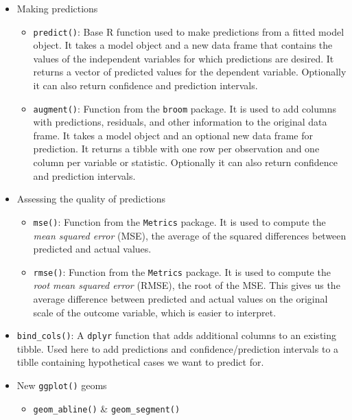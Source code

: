 \documentclass[
]{book}
\providecommand{\tightlist}{%
  \setlength{\itemsep}{0pt}\setlength{\parskip}{0pt}}
\begin{document}
\begin{itemize}
\tightlist
\item
  Making predictions

  \begin{itemize}
  \tightlist
  \item
    \texttt{predict()}: Base R function used to make predictions from a fitted model object. It takes a model object and a new data frame that contains the values of the independent variables for which predictions are desired. It returns a vector of predicted values for the dependent variable. Optionally it can also return confidence and prediction intervals.
  \item
    \texttt{augment()}: Function from the \texttt{broom} package. It is used to add columns with predictions, residuals, and other information to the original data frame. It takes a model object and an optional new data frame for prediction. It returns a tibble with one row per observation and one column per variable or statistic. Optionally it can also return confidence and prediction intervals.
  \end{itemize}
\item
  Assessing the quality of predictions

  \begin{itemize}
  \tightlist
  \item
    \texttt{mse()}: Function from the \texttt{Metrics} package. It is used to compute the \emph{mean squared error} (MSE), the average of the squared differences between predicted and actual values.
  \item
    \texttt{rmse()}: Function from the \texttt{Metrics} package. It is used to compute the \emph{root mean squared error} (RMSE), the root of the MSE. This gives us the average difference between predicted and actual values on the original scale of the outcome variable, which is easier to interpret.
  \end{itemize}
\item
  \texttt{bind\_cols()}: A \texttt{dplyr} function that adds additional columns to an existing tibble. Used here to add predictions and confidence/prediction intervals to a tiblle containing hypothetical cases we want to predict for.
\item
  New \texttt{ggplot()} geoms

  \begin{itemize}
  \tightlist
  \item
    \texttt{geom\_abline()} \& \texttt{geom\_segment()}
  \end{itemize}
\end{itemize}
\end{document}
